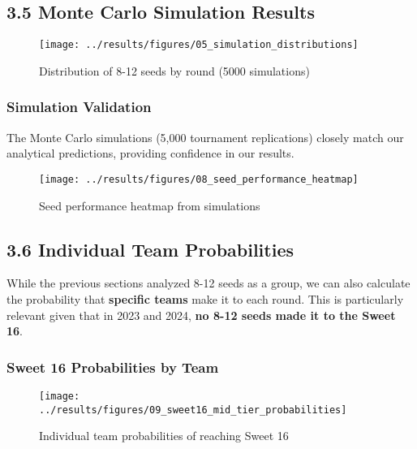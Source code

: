 \documentclass[
]{article}
\begin{document}
\subsection{3.5 Monte Carlo Simulation
Results}\label{monte-carlo-simulation-results}

\begin{figure}

{\centering \texttt{[image: ../results/figures/05\_simulation\_distributions]} 

}

\caption{Distribution of 8-12 seeds by round (5000 simulations)}\label{fig:simulation-plot}
\end{figure}

\subsubsection{Simulation Validation}\label{simulation-validation}

The Monte Carlo simulations (5,000 tournament replications) closely
match our analytical predictions, providing confidence in our results.

\begin{figure}

{\centering \texttt{[image: ../results/figures/08\_seed\_performance\_heatmap]} 

}

\caption{Seed performance heatmap from simulations}\label{fig:heatmap}
\end{figure}

\subsection{3.6 Individual Team
Probabilities}\label{individual-team-probabilities}

While the previous sections analyzed 8-12 seeds as a group, we can also
calculate the probability that \textbf{specific teams} make it to each
round. This is particularly relevant given that in 2023 and 2024,
\textbf{no 8-12 seeds made it to the Sweet 16}.

\subsubsection{Sweet 16 Probabilities by
Team}\label{sweet-16-probabilities-by-team}

\begin{figure}

{\centering \texttt{[image: ../results/figures/09\_sweet16\_mid\_tier\_probabilities]} 

}

\caption{Individual team probabilities of reaching Sweet 16}\label{fig:sweet16-individual-plot}
\end{figure}
\end{document}
